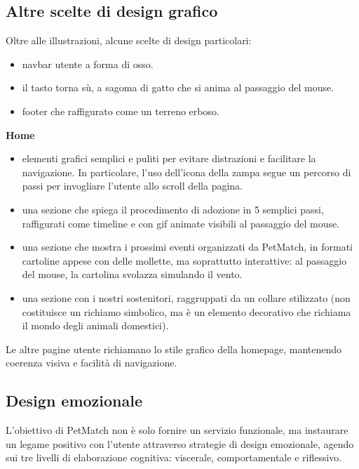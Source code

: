 \subsection{Altre scelte di design grafico}
Oltre alle illustrazioni, alcune scelte di design particolari:
\begin{itemize}
    \item navbar utente a forma di osso.
    \item il tasto torna sù, a sagoma di gatto che si anima al passaggio del mouse.
    \item footer che raffigurato come un terreno erboso.
\end{itemize}
\textbf{Home}
\begin{itemize}
    \item elementi grafici semplici e puliti per evitare distrazioni e facilitare la navigazione. In particolare, l'uso dell'icona della zampa segue un percorso di passi per invogliare l'utente allo scroll della pagina.
    \item una sezione che spiega il procedimento di adozione in 5 semplici passi, raffigurati come timeline e con gif animate visibili al passaggio del mouse.
    \item una sezione che mostra i prossimi eventi organizzati da PetMatch, in formati cartoline appese con delle mollette, ma soprattutto interattive: al passaggio del mouse, la cartolina svolazza simulando il vento.
    \item una sezione con i nostri sostenitori, raggruppati da un collare stilizzato (non costituisce un richiamo simbolico, ma è un elemento decorativo che richiama il mondo degli animali domestici).
\end{itemize}
Le altre pagine utente richiamano lo stile grafico della homepage, mantenendo coerenza visiva e facilità di navigazione.

\subsection{Design emozionale}
L'obiettivo di PetMatch non è solo fornire un servizio funzionale, ma instaurare un legame positivo con l'utente attraverso strategie di design emozionale, agendo sui tre livelli di elaborazione cognitiva: viscerale, comportamentale e riflessivo.


